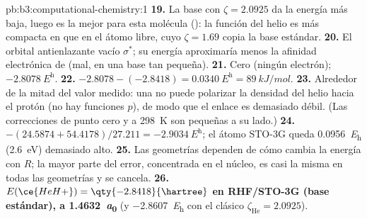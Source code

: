 \begin{solution}{pb:b3:computational-chemistry:1}
\textbf{19.} La base con $\zeta = 2.0925$ da la energía más baja, luego es la
mejor para esta molécula (): la función del helio
es más compacta en  que en el átomo libre, cuyo $\zeta = 1.69$ copia la
base estándar.
\textbf{20.} El orbital antienlazante vacío $\sigma^*$; su energía aproximaría
menos la afinidad electrónica de  (mal, en una base tan pequeña).
\textbf{21.} Cero (ningún electrón); $\qty{-2.8078}{\hartree}$.
\textbf{22.} $-2.8078 - (-2.8418) = \qty{0.0340}{\hartree} = \qty{89}{kJ/mol}$.
\textbf{23.} Alrededor de la mitad del valor medido: una  no puede polarizar la
densidad del helio hacia el protón (no hay funciones $p$), de modo que el enlace
es demasiado débil. (Las correcciones de punto cero y a \qty{298}{K} son pequeñas a su lado.)
\textbf{24.} $-(24.5874 + 54.4178)/27.211 = \qty{-2.9034}{\hartree}$; el átomo STO-3G
queda \qty{0.0956}{\hartree} (\qty{2.6}{eV}) demasiado alto.
\textbf{25.} Las geometrías dependen de cómo cambia la energía con $R$; la mayor parte del
error, concentrada en el núcleo, es casi la misma en todas las geometrías y
se cancela.
\textbf{26.} \textbf{$E(\ce{HeH+}) = \qty{-2.8418}{\hartree}$ en RHF/STO-3G (base
estándar), a \qty{1.4632}{\bohr}} (y \qty{-2.8607}{\hartree} con el clásico
$\zeta_{\mathrm{He}} = 2.0925$).
\end{solution}

